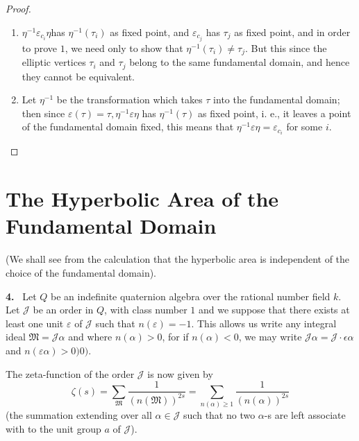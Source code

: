\begin{proof}
  \begin{enumerate}
  \item $\eta^{-1} \varepsilon_{c_i} \eta$\pageoriginale has $\eta ^{-1} (\tau_i)$
    as fixed point, and $\varepsilon_{c_j}$ has $\tau_j$ as fixed
    point, and in order to prove $1$, we need only to show that
    $\eta^{-1} (\tau_i) \neq \tau_j$. But this since the elliptic
    vertices $\tau_i$ and $\tau_j$ belong to the same fundamental
    domain, and hence they cannot be equivalent.  
  \item Let $\eta^{-1}$ be the transformation which takes $\tau$ into
    the fundamental domain; then since $\varepsilon(\tau) = \tau,
    \eta^{-1} \varepsilon \eta $ has $\eta ^{-1} (\tau)$ as fixed
    point, i. e.,  it leaves a point of the fundamental domain fixed,
    this means that $\eta^{-1} \varepsilon \eta = \varepsilon_{c_i}$
    for some $i$.  
  \end{enumerate}
\end{proof}

\section{The Hyperbolic Area of the Fundamental Domain}\label{chap2:sec6} %

(We shall see from the calculation that the hyperbolic area is
independent of the choice of the fundamental domain).  

\textbf{4.}~ Let $Q$ be an indefinite quaternion algebra over the rational
number field $k$. Let $\mathcal{J}$ be an order in $Q$, with class
number $1$ and we suppose that there exists at least one unit
$\varepsilon$ of $\mathcal{J}$ such that $n (\varepsilon ) = -1$. This
allows us write any integral ideal $\mathfrak{M} = \mathcal{J} \alpha$
and where $n (\alpha)> 0$, for if $n (\alpha)<0$, we may write
$\mathcal{J} \alpha = \mathcal{J} \cdot \epsilon \alpha$  and 
$n(\varepsilon \alpha ) > 0)0)$.  

The zeta-function of the order $\mathcal{J}$ is now given by 
$$
\zeta (s) = \sum_{\mathfrak{M}} \frac{1}{(n (\mathfrak{M}))^{2s}} =
\sum_{n (\alpha) \geq 1} \frac{1}{(n(\alpha))^{2s}} 
$$
(the summation extending over all $\alpha \in \mathcal{J}$ such that no
two $\alpha$-s are left associate with to the unit group $a$ of
$\mathcal{J}$).  

